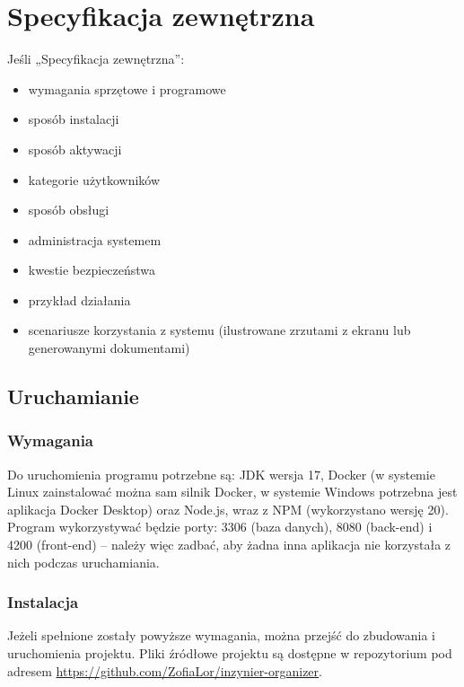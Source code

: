 \documentclass[a4paper,twoside,12pt]{book}
\begin{document}
\chapter{Specyfikacja zewnętrzna}
\label{ch:04}

Jeśli „Specyfikacja zewnętrzna”:
\begin{itemize}
\item  wymagania sprzętowe i programowe
\item  sposób instalacji
\item  sposób aktywacji
\item  kategorie użytkowników
\item  sposób obsługi
\item  administracja systemem
\item  kwestie bezpieczeństwa
\item  przykład działania
\item  scenariusze korzystania z systemu (ilustrowane zrzutami z ekranu lub generowanymi dokumentami)
\end{itemize}

\section{Uruchamianie}

\subsection{Wymagania}
Do uruchomienia programu potrzebne są: JDK wersja 17, Docker (w systemie Linux zainstalować można sam silnik Docker, w systemie Windows potrzebna jest aplikacja Docker Desktop) oraz Node.js, wraz z NPM (wykorzystano wersję 20). Program wykorzystywać będzie porty: 3306 (baza danych), 8080 (back-end) i 4200 (front-end) -- należy więc zadbać, aby żadna inna aplikacja nie korzystała z nich podczas uruchamiania.

\subsection{Instalacja}

Jeżeli spełnione zostały powyższe wymagania, można przejść do zbudowania i uruchomienia projektu. Pliki źródłowe projektu są dostępne w repozytorium pod adresem \url{https://github.com/ZofiaLor/inzynier-organizer}.
\end{document}
